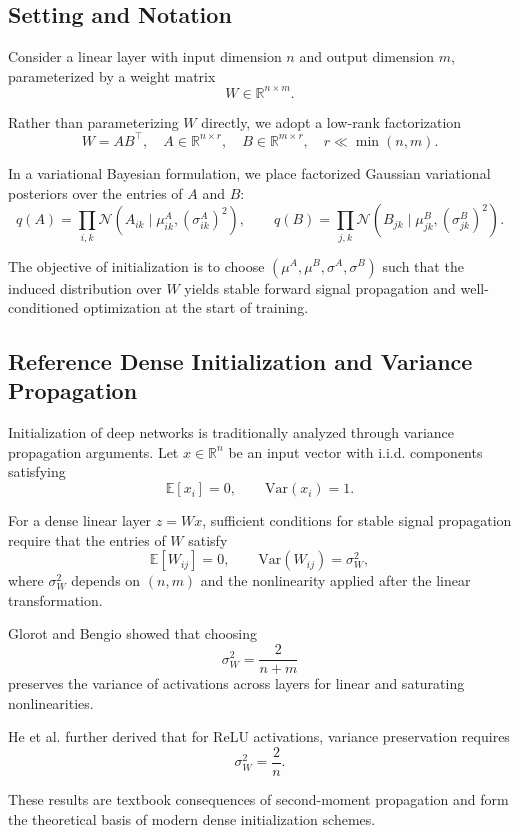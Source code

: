 \documentclass{article}
\theoremstyle{plain}
\theoremstyle{definition}
\theoremstyle{remark}
\begin{document}
\subsection{Setting and Notation}\label{app:init:setup}

Consider a linear layer with input dimension $n$ and output dimension $m$, parameterized by a weight matrix
\[
W \in \mathbb{R}^{n \times m}.
\]

Rather than parameterizing $W$ directly, we adopt a low-rank factorization
\[
W = AB^\top,
\quad
A \in \mathbb{R}^{n \times r},
\quad
B \in \mathbb{R}^{m \times r},
\quad
r \ll \min(n,m).
\]

In a variational Bayesian formulation, we place factorized Gaussian variational posteriors over the entries of $A$ and $B$:
\[
q(A) = \prod_{i,k} \mathcal{N}(A_{ik} \mid \mu^A_{ik}, (\sigma^A_{ik})^2),
\qquad
q(B) = \prod_{j,k} \mathcal{N}(B_{jk} \mid \mu^B_{jk}, (\sigma^B_{jk})^2).
\]

The objective of initialization is to choose $(\mu^A,\mu^B,\sigma^A,\sigma^B)$ such that the induced distribution over $W$ yields stable forward signal propagation and well-conditioned optimization at the start of training.

\subsection{Reference Dense Initialization and Variance Propagation}\label{app:init:dense}

Initialization of deep networks is traditionally analyzed through variance propagation arguments. Let $x \in \mathbb{R}^n$ be an input vector with i.i.d. components satisfying
\[
\mathbb{E}[x_i] = 0,
\qquad
\mathrm{Var}(x_i) = 1.
\]

For a dense linear layer $z = Wx$, sufficient conditions for stable signal propagation require that the entries of $W$ satisfy
\[
\mathbb{E}[W_{ij}] = 0,
\qquad
\mathrm{Var}(W_{ij}) = \sigma_W^2,
\]
where $\sigma_W^2$ depends on $(n,m)$ and the nonlinearity applied after the linear transformation.

Glorot and Bengio \cite{pmlr-v9-glorot10a} showed that choosing
\[
\sigma_W^2 = \frac{2}{n + m}
\]
preserves the variance of activations across layers for linear and saturating nonlinearities.

He et al. \cite{he2015delving} further derived that for ReLU activations, variance preservation requires
\[
\sigma_W^2 = \frac{2}{n}.
\]

These results are textbook consequences of second-moment propagation and form the theoretical basis of modern dense initialization schemes.
\end{document}
